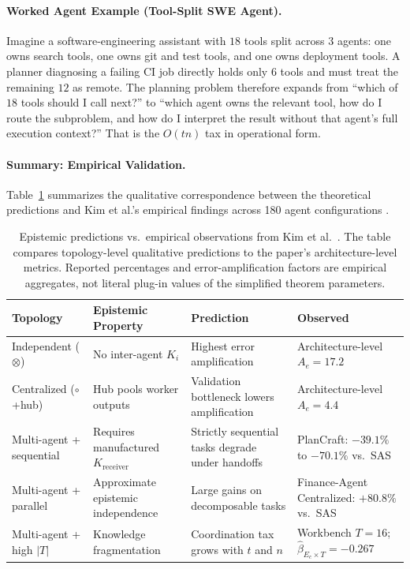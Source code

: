 \paragraph{Worked Agent Example (Tool-Split SWE Agent).}
Imagine a software-engineering assistant with $18$ tools split across $3$ agents: one owns search tools, one owns git and test tools, and one owns deployment tools. A planner diagnosing a failing CI job directly holds only $6$ tools and must treat the remaining $12$ as remote. The planning problem therefore expands from ``which of $18$ tools should I call next?'' to ``which agent owns the relevant tool, how do I route the subproblem, and how do I interpret the result without that agent's full execution context?'' That is the $O(tn)$ tax in operational form.

\paragraph{Summary: Empirical Validation.}
Table~\ref{tab:epistemic-predictions} summarizes the qualitative correspondence between the theoretical predictions and Kim et al.'s empirical findings across 180 agent configurations \cite{kim2025scaling}.

\begin{table}[h]
\centering
\small
\begin{tabular}{@{}p{}p{}p{}p{}@{}}
\toprule
\textbf{Topology} & \textbf{Epistemic Property} & \textbf{Prediction} & \textbf{Observed} \\
\midrule
Independent ($\otimes$) & No inter-agent $K_i$ & Highest error amplification & Architecture-level $A_e = 17.2$ \\
Centralized ($\circ$+hub) & Hub pools worker outputs & Validation bottleneck lowers amplification & Architecture-level $A_e = 4.4$ \\
Multi-agent + sequential & Requires manufactured $K_{\mathrm{receiver}}$ & Strictly sequential tasks degrade under handoffs & PlanCraft: $-39.1\%$ to $-70.1\%$ vs.\ SAS \\
Multi-agent + parallel & Approximate epistemic independence & Large gains on decomposable tasks & Finance-Agent Centralized: $+80.8\%$ vs.\ SAS \\
Multi-agent + high $|T|$ & Knowledge fragmentation & Coordination tax grows with $t$ and $n$ & Workbench $T=16$; $\hat{\beta}_{E_c \times T} = -0.267$ \\
\bottomrule
\end{tabular}
\caption{Epistemic predictions vs.\ empirical observations from Kim et al.~\cite{kim2025scaling}. The table compares topology-level qualitative predictions to the paper's architecture-level metrics. Reported percentages and error-amplification factors are empirical aggregates, not literal plug-in values of the simplified theorem parameters.}
\label{tab:epistemic-predictions}
\end{table}

